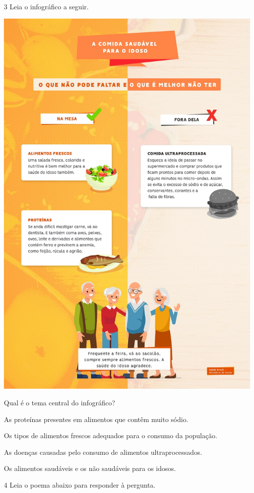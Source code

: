\begin{myquote}
\begin{myescolha}
\num{3} Leia o infográfico a seguir.

\begin{myquote}

\begin{center}
\includegraphics[width=.5\textwidth]{media/image38.jpeg}
\end{center}

\end{myquote}


Qual é o tema central do infográfico?

\begin{escolha}
\item As proteínas presentes em alimentos que contêm muito sódio.

\item Os tipos de alimentos frescos adequados para o consumo da população.

\item As doenças causadas pelo consumo de alimentos ultraprocessados.

\item Os alimentos saudáveis e os não saudáveis para os idosos.
\end{escolha}

\num{4} Leia o poema abaixo para responder à pergunta.


\end{myescolha}
\end{myquote}
